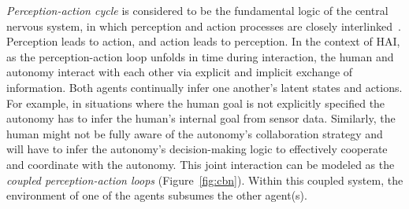 \documentclass[12pt]{article}
\begin{document}
\textit{Perception-action cycle} is considered to be the fundamental logic of the central nervous system, in which perception and action processes are closely interlinked~\cite{cutsuridis2013cognitive}. Perception leads to action, and action leads to perception.
In the context of HAI, as the perception-action loop unfolds in time during interaction, 
the human and autonomy interact with each other via explicit and implicit exchange of information. Both agents continually infer one another's latent states and actions. For example, in situations where the human goal is not explicitly specified the autonomy has to infer the human's internal goal from sensor data. Similarly, the human might not be fully aware of the autonomy's collaboration strategy and will have to infer the autonomy's decision-making logic to effectively cooperate and coordinate with the autonomy. This joint interaction can be modeled as the \textit{coupled perception-action loops} (Figure~\ref{fig:cbn}). Within this coupled system, the environment of one of the agents subsumes the other agent(s).
\end{document}

